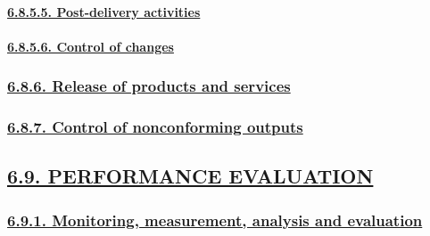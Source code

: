 \documentclass[
]{article}
\begin{document}
\hypertarget{post-delivery-activities}{%
\paragraph{\texorpdfstring{\protect\hyperlink{post-delivery-activities-1}{6.8.5.5.
Post-delivery
activities}}{6.8.5.5. Post-delivery activities}}\label{post-delivery-activities}}

\hypertarget{control-of-changes}{%
\paragraph{\texorpdfstring{\protect\hyperlink{control-of-changes-1}{6.8.5.6.
Control of
changes}}{6.8.5.6. Control of changes}}\label{control-of-changes}}

\hypertarget{release-of-products-and-services}{%
\subsubsection{\texorpdfstring{\protect\hyperlink{release-of-products-and-services-1}{6.8.6.
Release of products and
services}}{6.8.6. Release of products and services}}\label{release-of-products-and-services}}

\hypertarget{control-of-nonconforming-outputs}{%
\subsubsection{\texorpdfstring{\protect\hyperlink{control-of-nonconforming-outputs-1}{6.8.7.
Control of nonconforming
outputs}}{6.8.7. Control of nonconforming outputs}}\label{control-of-nonconforming-outputs}}

\hypertarget{performance-evaluation}{%
\subsection{\texorpdfstring{\protect\hyperlink{performance-evaluation-1}{6.9.
PERFORMANCE
EVALUATION}}{6.9. PERFORMANCE EVALUATION}}\label{performance-evaluation}}

\hypertarget{monitoring-measurement-analysis-and-evaluation}{%
\subsubsection{\texorpdfstring{\protect\hyperlink{monitoring-measurement-analysis-and-evaluation-1}{6.9.1.
Monitoring, measurement, analysis and
evaluation}}{6.9.1. Monitoring, measurement, analysis and evaluation}}\label{monitoring-measurement-analysis-and-evaluation}}
\end{document}

